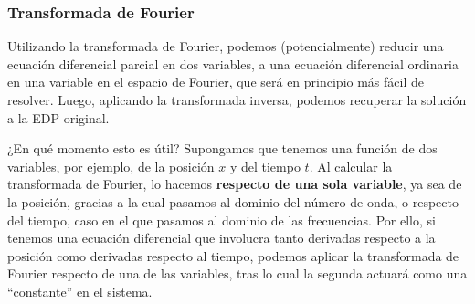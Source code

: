 \subsubsection{Transformada de Fourier}

Utilizando la transformada de Fourier, podemos (potencialmente) reducir una ecuación diferencial parcial en dos variables, a una ecuación diferencial ordinaria en una variable en el espacio de Fourier, que será en principio más fácil de resolver. Luego, aplicando la transformada inversa, podemos recuperar la solución a la EDP original.

¿En qué momento esto es útil? Supongamos que tenemos una función de dos variables, por ejemplo, de la posición $x$ y del tiempo $t$. Al calcular la transformada de Fourier, lo hacemos \textbf{respecto de una sola variable}, ya sea de la posición, gracias a la cual pasamos al dominio del número de onda, o respecto del tiempo, caso en el que pasamos al dominio de las frecuencias. Por ello, si tenemos una ecuación diferencial que involucra tanto derivadas respecto a la posición como derivadas respecto al tiempo, podemos aplicar la transformada de Fourier respecto de una de las variables, tras lo cual la segunda actuará como una ``constante'' en el sistema.


